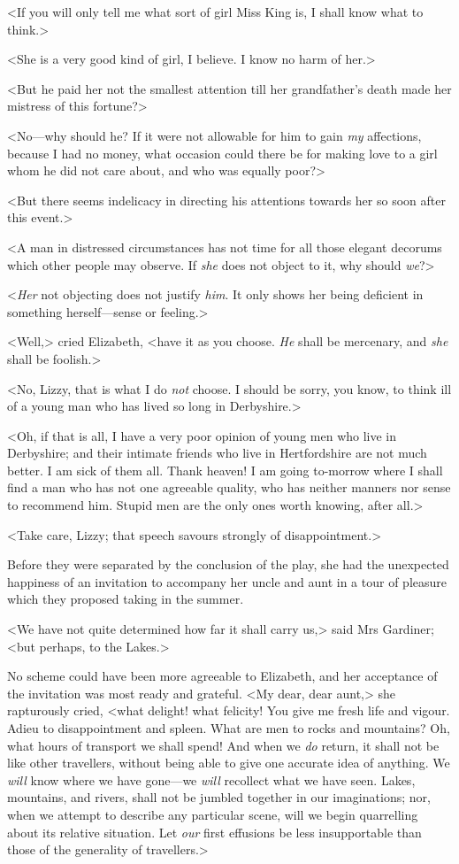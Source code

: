 <If you will only tell me what sort of girl Miss King is, I shall know what to think.>

<She is a very good kind of girl, I believe. I know no harm of her.>

<But he paid her not the smallest attention till her grandfather's death made her mistress of this fortune?>

<No—why should he? If it were not allowable for him to gain \textit{my} affections, because I had no money, what occasion could there be for making love to a girl whom he did not care about, and who was equally poor?>

<But there seems indelicacy in directing his attentions towards her so soon after this event.>

<A man in distressed circumstances has not time for all those elegant decorums which other people may observe. If \textit{she} does not object to it, why should \textit{we}?>

<\textit{Her} not objecting does not justify \textit{him}. It only shows her being deficient in something herself—sense or feeling.>

<Well,> cried Elizabeth, <have it as you choose. \textit{He} shall be mercenary, and \textit{she} shall be foolish.>

<No, Lizzy, that is what I do \textit{not} choose. I should be sorry, you know, to think ill of a young man who has lived so long in Derbyshire.>

<Oh, if that is all, I have a very poor opinion of young men who live in Derbyshire; and their intimate friends who live in Hertfordshire are not much better. I am sick of them all. Thank heaven! I am going to-morrow where I shall find a man who has not one agreeable quality, who has neither manners nor sense to recommend him. Stupid men are the only ones worth knowing, after all.>

<Take care, Lizzy; that speech savours strongly of disappointment.>

Before they were separated by the conclusion of the play, she had the unexpected happiness of an invitation to accompany her uncle and aunt in a tour of pleasure which they proposed taking in the summer.

<We have not quite determined how far it shall carry us,> said Mrs Gardiner; <but perhaps, to the Lakes.>

No scheme could have been more agreeable to Elizabeth, and her acceptance of the invitation was most ready and grateful. <My dear, dear aunt,> she rapturously cried, <what delight! what felicity! You give me fresh life and vigour. Adieu to disappointment and spleen. What are men to rocks and mountains? Oh, what hours of transport we shall spend! And when we \textit{do} return, it shall not be like other travellers, without being able to give one accurate idea of anything. We \textit{will} know where we have gone—we \textit{will} recollect what we have seen. Lakes, mountains, and rivers, shall not be jumbled together in our imaginations; nor, when we attempt to describe any particular scene, will we begin quarrelling about its relative situation. Let \textit{our} first effusions be less insupportable than those of the generality of travellers.>